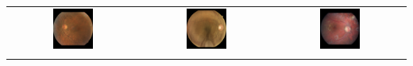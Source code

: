 \begin{frame}
{\begin{tabular}{@{}c@{}@{}c@{}@{}c@{}}
	\includegraphics[width=0.33\textwidth]{pics/classified_samples/197_left_0.jpg} &
	\includegraphics[width=0.33\textwidth]{pics/classified_samples/82_right_2.jpg} &
	\includegraphics[width=0.33\textwidth]{pics/classified_samples/2496_left_4.jpg} \\\noalign{\vspace{-0.15cm}}


\end{tabular}}
\end{frame}
